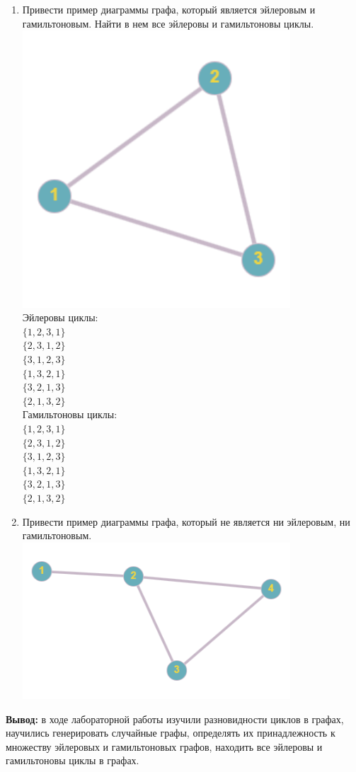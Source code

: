 \documentclass[a4paper,14pt]{extarticle}
\begin{document}
\begin{enumerate}[1.]
    \item Привести пример диаграммы графа, который является эйлеровым
          и гамильтоновым. Найти в нем все эйлеровы и гамильтоновы циклы.\\
          \includegraphics[width=100mm]{6}\\
          Эйлеровы циклы:\\
          $\{1, 2, 3, 1\}$\\
          $\{2, 3, 1, 2\}$\\
          $\{3, 1, 2, 3\}$\\
          $\{1, 3, 2, 1\}$\\
          $\{3, 2, 1, 3\}$\\
          $\{2, 1, 3, 2\}$\\
          Гамильтоновы циклы:\\
          $\{1, 2, 3, 1\}$\\
          $\{2, 3, 1, 2\}$\\
          $\{3, 1, 2, 3\}$\\
          $\{1, 3, 2, 1\}$\\
          $\{3, 2, 1, 3\}$\\
          $\{2, 1, 3, 2\}$

    \item Привести пример диаграммы графа, который не является ни
          эйлеровым, ни гамильтоновым.\\
          \includegraphics[width=100mm]{7}

\end{enumerate}
\textbf{Вывод: } в ходе лабораторной работы изучили разновидности циклов в графах, научились генерировать случайные графы,
определять их принадлежность к множеству эйлеровых и гамильтоновых графов, находить все эйлеровы и гамильтоновы циклы в графах.
\end{document}
